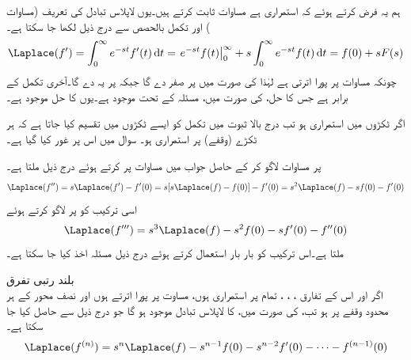 ہم یہ  فرض کرتے ہوئے  کہ   استمراری ہے مساوات  ثابت کرتے ہیں۔یوں لاپلاس تبادل کی تعریف (مساوات ) اور تکمل بالحصص سے درج ذیل لکھا جا سکتا ہے۔
\begin{align*}
\Laplace(f')=\int_{0}^{\infty} e^{-st} f'(t)\dif t=\left. e^{-st} f(t) \right|_{0}^{\infty}+s\int_{0}^{\infty} e^{-st}f(t)\dif t=f(0)+sF(s)
\end{align*}
چونکہ  مساوات  پر پورا اترتی ہے لہٰذا  کی صورت میں   پر صفر دے گا جبکہ  پر یہ  دے گا۔آخری تکمل  کے برابر ہے  جس کا حل،  کی  صورت میں، مسئلہ  کے تحت موجود ہے۔یوں  کا حل موجود ہے۔

اگر  ٹکڑوں میں استمراری ہو تب درج بالا ثبوت میں تکمل کو ایسے ٹکڑوں میں تقسیم کیا جاتا ہے کہ ہر ٹکڑے (وقفے) پر  استمراری ہو۔ سوال  میں اس پر غور کیا گیا ہے۔

 پر مساوات   لاگو کر کے حاصل جواب میں مساوات  پر کرتے ہوئے درج ذیل ملتا ہے۔
\begin{align}\label{مساوات_لاپلاس_درجہ_دوم_تفرق}
\Laplace(f'')=s\Laplace(f')-f'(0)=s[s\Laplace(f)-f(0)]-f'(0)=s^2\Laplace(f)-sf(0)-f'(0)
\end{align}
اسی ترکیب کو  پر لاگو کرتے ہوئے
\begin{align}\label{مساوات_لاپلاس_درجہ_تین_تفرق}
\Laplace(f''')=s^3\Laplace(f)-s^2f(0)-sf'(0)-f''(0)
\end{align}
ملتا ہے۔اس ترکیب کو بار بار استعمال کرتے ہوئے درج ذیل مسئلہ اخذ کیا جا سکتا ہے۔

\quad بلند رتبی تفرق \\
اگر  اور اس کے تفارق ، ، ،   تمام  پر استمراری ہوں، مساوت  پر پورا اترتے ہوں اور  نصف محور  کے ہر محدود وقفے پر  ہو تب،  کی صورت میں،  کا لاپلاس تبادل موجود ہو گا جو درج ذیل سے حاصل کیا جا سکتا ہے۔
\begin{align}\label{مساوات_لاپلاس_بلند_درجی_تفرق}
\Laplace(f^{(n)})=s^n\Laplace(f)-s^{n-1}f(0)-s^{n-2}f'(0)-\cdots -f^{(n-1)}(0)
\end{align}

